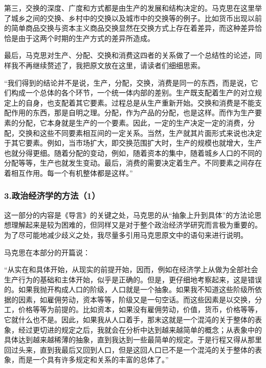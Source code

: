 \documentclass[a4paper,twoside,12pt,AutoFakeBold]{ctexart}
\begin{document}
第三，交换的深度、广度和方式都是由生产的发展和结构决定的。马克思在这里举了城乡之间的交换、乡村中的交换以及城市中的交换等的例子。比如货币出现以前的简单商品交换与资本主义商品交换显然在交换方式上存在着差异，而这种差异恰恰是由于这两个时期的生产方式的差异所造成。

最后，马克思对生产、分配、交换和消费这四者的关系做了一个总结性的论述，同样我不再继续赘述了，我把原文放在这里，请读者们细细思索。

\begin{adjustwidth}{2em}{2em}
    \qquad\fangsong
“我们得到的结论并不是说，生产，分配，交换，消费是同一的东西，而是说，它们构成一个总体的各个环节，一个统一体内部的差别。生产既支配着生产的对立规定上的自身，也支配着其它要素。过程总是从生产重新开始。交换和消费是不能支配作用的东西，那是自明之理。分配，作为产品的分配，也是这样。而作为生产要素的分配，它本身就是生产的一个要素。因此，一定的生产决定一定的消费，分配，交换和这些不同要素相互间的一定关系。当然，生产就其片面形式来说也决定于其它要素。例如，当市场扩大，即交换范围扩大时，生产的规模也就增大，生产也就分得更细。随着分配的变动，例如，随着资本的集中，随着城乡人口的不同的分配等等，生产也就发生变动。最后，消费的需要决定着生产。不同要素之间存在着相互作用。每一个有机整体都是这样。”
\end{adjustwidth}

\subsubsection{3.政治经济学的方法（1）}

这一部分的内容是《导言》的关键之处，马克思的从“抽象上升到具体”的方法论思想理解起来是较为困难的，但同样又是对于整个政治经济学研究而言极为重要的。为了尽可能地减少歧义之处，我尽量多引用马克思原文中的语句来进行说明。

马克思在本部分的开篇说：
\begin{adjustwidth}{2em}{2em}
    \qquad\fangsong
    “从实在和具体开始，从现实的前提开始，因而，例如在经济学上从做为全部社会生产行为的基础和主体开始，似乎是正确的。但是，更仔细地考察起来，这是错误的。如果我抛开构成人口的阶级，人口就是一个抽象。如果我不知道这些阶级所依据的因素，如雇佣劳动，资本等等，阶级又是一句空话。而这些因素是以交换，分工，价格等等为前提的。比如资本，如果没有雇佣劳动，价值，货币，价格等等，它就什么也不是。因此，如果我从人口着手，那末这就是一个混沌的关于整体的表象，经过更切进的规定之后，我就会在分析中达到越来越简单的概念；从表象中的具体达到越来越稀薄的抽象，直到我达到一些最简单的规定。于是行程又得从那里回过头来，直到我最后又回到人口，但是这回人口已不是一个混沌的关于整体的表象，而是一个具有许多规定和关系的丰富的总体了。”
\end{adjustwidth}
\end{document}
